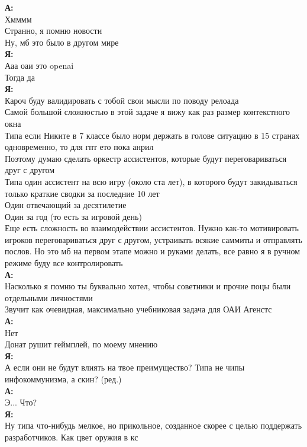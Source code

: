 \begin{tabbing}
\textbf{А:}\\
Хмммм\\
Странно, я помню новости\\
Ну, мб это было в другом мире\\

\textbf{Я:}\\
Ааа оаи это openai\\
Тогда да\\
\textbf{Я:}\\
Кароч буду валидировать с тобой свои мысли по поводу релоада\\
Самой большой сложностью в этой задаче я вижу как раз размер контекстного окна\\
Типа если Никите в 7 классе было норм держать в голове ситуацию в 15 странах одновременно, то для гпт ето пока анрил\\
Поэтому думаю сделать оркестр ассистентов, которые будут переговариваться друг с другом\\
Типа один ассистент на всю игру (около ста лет), в которого будут закидываться только краткие сводки за последние 10 лет\\
Один отвечающий за десятилетие\\
Один за год (то есть за игровой день)\\
Еще есть сложность во взаимодействии ассистентов. Нужно как-то мотивировать игроков переговариваться друг с другом, устраивать всякие саммиты и отправлять послов. Но это мб на первом этапе можно и руками делать, все равно я в ручном режиме буду все контролировать\\

\textbf{А:}\\
Насколько я помню ты буквально хотел, чтобы советники и прочие поцы были отдельными личностями\\
Звучит как очевидная, максимально учебниковая задача для ОАИ Агенстс\\
\textbf{А:}\\
Нет\\
Донат рушит геймплей, по моему мнению\\

\textbf{Я:}\\
А если они не будут влиять на твое преимущество? Типа не чипы инфокоммунизма, а скин? (ред.)\\

\textbf{А:}\\
Э... Что?\\

\textbf{Я:}\\
Ну типа что-нибудь мелкое, но прикольное, созданное скорее с целью поддержать разработчиков. Как цвет оружия в кс\\


\end{tabbing}
